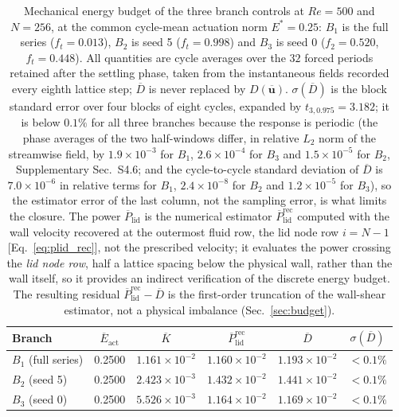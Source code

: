 \documentclass[11pt,a4paper]{article}
\newcommand{\Dbar}{\overline{D}}
\begin{document}
\begin{table}[t]
\centering
\caption{Mechanical energy budget of the three branch controls at $Re=500$ and
$N=256$, at the common cycle-mean actuation norm $E^\ast=0.25$: $B_1$ is the full
series ($f_t=0.013$), $B_2$ is seed 5 ($f_t=0.998$) and $B_3$ is seed 0
($f_2=0.520$, $f_t=0.448$). All quantities are cycle averages over the $32$ forced
periods retained after the settling phase, taken from the instantaneous fields
recorded every eighth lattice step; $\Dbar$ is never replaced by
$D(\overline{\mathbf{u}})$. $\sigma(\Dbar)$ is the block standard error over four
blocks of eight cycles, expanded by $t_{3,0.975}=3.182$; it is below $0.1\%$ for
all three branches because the response is periodic (the phase averages of the two
half-windows differ, in relative $L_2$ norm of the streamwise field, by
$1.9\times10^{-3}$ for $B_1$, $2.6\times10^{-4}$ for $B_3$ and $1.5\times10^{-5}$
for $B_2$, Supplementary Sec.~S4.6; and the
cycle-to-cycle standard deviation of $\Dbar$ is $7.0\times10^{-6}$ in relative
terms for $B_1$, $2.4\times10^{-8}$ for $B_2$ and $1.2\times10^{-5}$ for $B_3$),
so the estimator error of the last column, not the sampling error, is what limits
the closure. The power $\overline{P}_{\mathrm{lid}}$ is the numerical estimator
$\overline{P}_{\mathrm{lid}}^{\mathrm{rec}}$ computed with the
wall velocity recovered at the outermost fluid row, the lid node row
$i=N-1$ [Eq.~\eqref{eq:plid_rec}], not the
prescribed velocity; it evaluates the power crossing the \emph{lid node row},
half a lattice spacing below the physical wall, rather than the wall itself, so it
provides an indirect verification of the discrete energy budget. The resulting residual
$\overline{P}_{\mathrm{lid}}^{\mathrm{rec}}-\Dbar$ is the first-order truncation of the wall-shear
estimator, not a physical imbalance (Sec.~\ref{sec:budget}).}
\label{tab:budget}
\small
\begin{tabular}{lccccc}
\toprule
Branch & $\overline{E}_{\mathrm{act}}$ & $\overline{K}$ & $\overline{P}_{\mathrm{lid}}^{\mathrm{rec}}$
& $\Dbar$ & $\sigma(\Dbar)$\\
\midrule
$B_1$ (full series) & 0.2500 & $1.161\times10^{-2}$ & $1.160\times10^{-2}$ & $1.193\times10^{-2}$ & $<0.1\%$\\
$B_2$ (seed 5) & 0.2500 & $2.423\times10^{-3}$ & $1.432\times10^{-2}$ & $1.441\times10^{-2}$ & $<0.1\%$\\
$B_3$ (seed 0) & 0.2500 & $5.526\times10^{-3}$ & $1.164\times10^{-2}$ & $1.169\times10^{-2}$ & $<0.1\%$\\
\bottomrule
\end{tabular}
\end{table}
\end{document}
